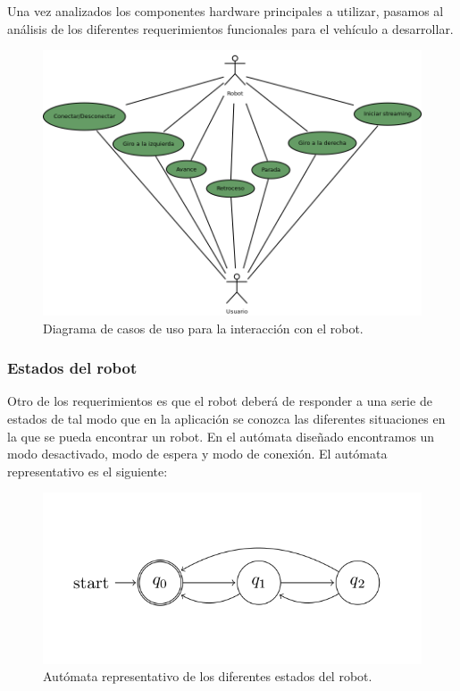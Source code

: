 Una vez analizados los componentes hardware principales a utilizar, pasamos al análisis de los diferentes requerimientos funcionales para el vehículo a desarrollar.

\begin{figure}[H]
  \begin{center}
    \includegraphics[scale=.5]{diagramas/casos-uso-robot.png}
  \end{center}
  \caption{Diagrama de casos de uso para la interacción con el robot.}
  \label{diagram:caso-uso}
\end{figure}

\subsubsection{Estados del robot}

Otro de los requerimientos es que el robot deberá de responder a una serie de estados de tal modo que en la aplicación se conozca las diferentes situaciones en la que se pueda encontrar un robot.
En el autómata diseñado encontramos un modo desactivado, modo de espera y modo de conexión. El autómata representativo es el siguiente:\\

\begin{figure}[H]
  \begin{center}
    \includegraphics[scale=0.6]{imagenes/robot/automata-estados.png}
  \end{center}
  \caption{Autómata representativo de los diferentes estados del robot.}
  \label{figura:automata-estados}
\end{figure}

